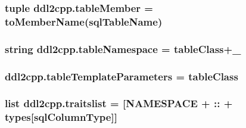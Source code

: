 \subsubsection[{table\+Member}]{\setlength{\rightskip}{0pt plus 5cm}tuple ddl2cpp.\+table\+Member = {\bf to\+Member\+Name}({\bf sql\+Table\+Name})}\label{namespaceddl2cpp_af01677d026a7e6ca36b20121ad0a3c80}
\hypertarget{namespaceddl2cpp_a1b72644ae79adb19e5e0fc6134cf375b}{}
\subsubsection[{table\+Namespace}]{\setlength{\rightskip}{0pt plus 5cm}string ddl2cpp.\+table\+Namespace = {\bf table\+Class}+\textquotesingle{}\+\_\+\textquotesingle{}}\label{namespaceddl2cpp_a1b72644ae79adb19e5e0fc6134cf375b}
\hypertarget{namespaceddl2cpp_a191322d8af5b19a0af69d0eaa33436ee}{}
\subsubsection[{table\+Template\+Parameters}]{\setlength{\rightskip}{0pt plus 5cm}ddl2cpp.\+table\+Template\+Parameters = {\bf table\+Class}}\label{namespaceddl2cpp_a191322d8af5b19a0af69d0eaa33436ee}
\hypertarget{namespaceddl2cpp_ae4617ceb48a964dcaa04cbdd62e515ea}{}
\subsubsection[{traitslist}]{\setlength{\rightskip}{0pt plus 5cm}list ddl2cpp.\+traitslist = \mbox{[}{\bf N\+A\+M\+E\+S\+P\+A\+C\+E} + \textquotesingle{}\+::\textquotesingle{} + {\bf types}\mbox{[}{\bf sql\+Column\+Type}\mbox{]}\mbox{]}}\label{namespaceddl2cpp_ae4617ceb48a964dcaa04cbdd62e515ea}
\hypertarget{namespaceddl2cpp_aa60a82f28e1ca899d699db901e2de22b}{}

